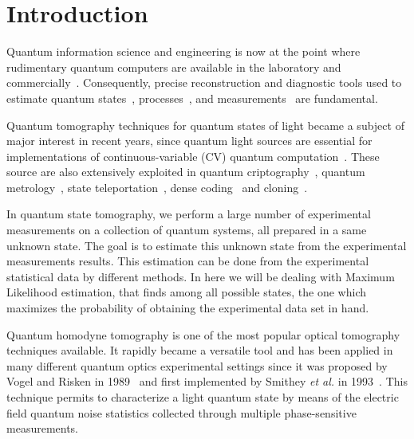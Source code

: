 \documentclass[
reprint,
superscriptaddress,
showpacs,
amsmath,
amssymb,
aps,
pra,
longbibliography
]{revtex4-1}
\begin{document}
\section{Introduction}
\label{intro}
Quantum information science and engineering is now at the point where 
rudimentary quantum computers are available in the laboratory and 
commercially~\cite{kandala2017,Linke2017,Monk2017,Denchev2016}.
Consequently, precise reconstruction and diagnostic tools used to estimate 
quantum states~\cite{Vogel1989, Smithey1993, Dunn1995, Banaszek1999, Banaszek2000, White2002, Ourjoumtsev2007, Neergaard2006}, 
processes~\cite{Chuang1997, Poyatos1997, Altepeter2003, Dariano1998, Nielsen1998, Mitchell2003, Obrien2004,Kupchak2015}, and 
measurements~\cite{Luis1999, Fiurasek2001, Dariano2004, Lundeen2009} are fundamental.

Quantum tomography techniques for quantum states of light became a subject of
major interest in recent years, since quantum light sources are essential
for implementations of continuous-variable (CV) quantum computation~\cite{Lloyd1999, Gottesman2001, Bartlett2002, Jeong2002, Ralph2003}. 
These source are also extensively exploited in quantum criptography~\cite{Ralph1999, Hillery2000, Silberhorn2002, Pirandola2008, Luiz2017}, 
quantum metrology~\cite{Eberle2010, Demkowicz2013}, state teleportation~\cite{Vaidman1994, Braunstein1998, He2015}, dense 
coding~\cite{Braunstein2000, Lee2014} and cloning~\cite{Cerf2000, Braunstein2001}. 

In quantum state tomography, we perform a large number of experimental measurements on
a collection of quantum systems, all prepared in a same unknown state. The goal is to
estimate this unknown state from the experimental measurements results. This estimation
can be done from the experimental statistical data by different methods. In here
we will be dealing with Maximum Likelihood estimation, that finds among all possible
states, the one which maximizes the probability of obtaining the experimental data set
in hand. 

Quantum homodyne tomography is one of the most popular optical tomography techniques
available. It rapidly became a versatile tool and has been applied in many different quantum optics experimental settings since 
it was proposed by Vogel and Risken in 1989~\cite{Vogel1989} and first implemented by Smithey \textit{et al.} in 1993~\cite{Smithey1993}. 
This technique permits to characterize a light quantum state by means of the electric field quantum noise statistics 
collected through multiple phase-sensitive measurements. 
\end{document}
